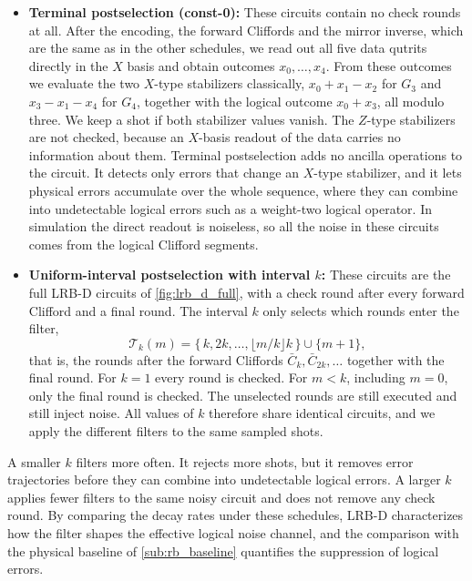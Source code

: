\begin{itemize}
    \item \textbf{Terminal postselection (const-0):} These circuits contain no check rounds at all. After the encoding, the forward Cliffords and the mirror inverse, which are the same as in the other schedules, we read out all five data qutrits directly in the $X$ basis and obtain outcomes $x_0, \dots, x_4$. From these outcomes we evaluate the two $X$-type stabilizers classically, $x_0 + x_1 - x_2$ for $G_3$ and $x_3 - x_1 - x_4$ for $G_4$, together with the logical outcome $x_0 + x_3$, all modulo three. We keep a shot if both stabilizer values vanish. The $Z$-type stabilizers are not checked, because an $X$-basis readout of the data carries no information about them. Terminal postselection adds no ancilla operations to the circuit. It detects only errors that change an $X$-type stabilizer, and it lets physical errors accumulate over the whole sequence, where they can combine into undetectable logical errors such as a weight-two logical operator. In simulation the direct readout is noiseless, so all the noise in these circuits comes from the logical Clifford segments.

    \item \textbf{Uniform-interval postselection with interval $k$:} These circuits are the full LRB-D circuits of \autoref{fig:lrb_d_full}, with a check round after every forward Clifford and a final round. The interval $k$ only selects which rounds enter the filter,
    \begin{equation}
        \mathcal{T}_k(m) = \{\, k, 2k, \dots, \lfloor m/k \rfloor k \,\} \cup \{ m+1 \},
        \label{eq:unif_rounds}
    \end{equation}
    that is, the rounds after the forward Cliffords $\bar C_k, \bar C_{2k}, \dots$ together with the final round. For $k = 1$ every round is checked. For $m < k$, including $m = 0$, only the final round is checked. The unselected rounds are still executed and still inject noise. All values of $k$ therefore share identical circuits, and we apply the different filters to the same sampled shots.
\end{itemize}

A smaller $k$ filters more often. It rejects more shots, but it removes error trajectories before they can combine into undetectable logical errors. A larger $k$ applies fewer filters to the same noisy circuit and does not remove any check round. By comparing the decay rates under these schedules, LRB-D characterizes how the filter shapes the effective logical noise channel, and the comparison with the physical baseline of \autoref{sub:rb_baseline} quantifies the suppression of logical errors.

